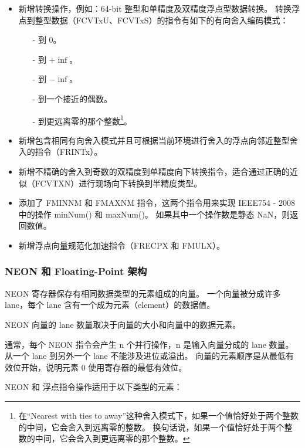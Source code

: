 \begin{itemize}
  \item 新增转换操作，例如：64-bit 整型和单精度及双精度浮点型数据转换。
    转换浮点到整型数据（FCVTxU、FCVTxS）的指令有如下的有向舍入编码模式：

    \begin{itemize}
      \item[-] 到 0。
      \item[-] 到 $+\inf$。
      \item[-] 到 $-\inf$。
      \item[-] 到一个接近的偶数。
      \item[-] 到更远离零的那个整数\footnote{在“Nearest with ties to away”这种舍入模式下，如果一个值恰好处于两个整数的中间，它会舍入到远离零的整数。
          换句话说，如果一个值恰好处于两个整数的中间，它会舍入到更远离零的那个整数。
        }。
    \end{itemize}
  \item 新增包含相同有向舍入模式并且可根据当前环境进行舍入的浮点向邻近整型舍入的指令（FRINTx）。
  \item 新增不精确的舍入到奇数的双精度到单精度向下转换指令，适合通过正确的近似（FCVTXN）进行现场向下转换到半精度类型。
  \item 添加了 FMINNM 和 FMAXNM 指令，这两个指令用来实现 IEEE754 - 2008 中的操作 minNum() 和 maxNum()。
  如果其中一个操作数是静态 NaN，则返回数值。
  \item 新增浮点向量规范化加速指令（FRECPX 和 FMULX）。
\end{itemize}

\subsubsection{NEON 和 Floating-Point 架构}

NEON 寄存器保存有相同数据类型的元素组成的向量。
一个向量被分成许多 lane，每个 lane 含有一个成为元素（element）的数据值。

NEON 向量的 lane 数量取决于向量的大小和向量中的数据元素。

通常，每个 NEON 指令会产生 n 个并行操作，n 是输入向量分成的 lane 数量。
从一个 lane 到另外一个 lane 不能涉及进位或溢出。
向量的元素顺序是从最低有效位开始，说明元素 0 使用寄存器的最低有效位。

NEON 和 浮点指令操作适用于以下类型的元素：

